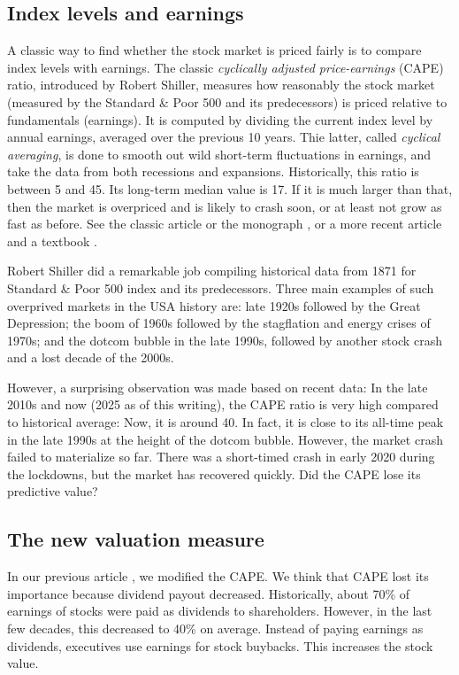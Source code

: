 \documentclass[12pt]{amsart}
\begin{document}
\subsection{Index levels and earnings} A classic way to find whether the stock market is priced fairly is to compare index levels with earnings. The classic {\it cyclically adjusted price-earnings} (CAPE) ratio, introduced by Robert Shiller, measures how reasonably the stock market (measured by the Standard \& Poor 500 and its predecessors) is priced relative to fundamentals (earnings). It is computed by dividing the current index level by annual earnings, averaged over the previous 10 years. Thie latter, called {\it cyclical averaging}, is done to smooth out wild short-term fluctuations in earnings, and take the data from both recessions and expansions. Historically, this ratio is between 5 and 45. Its long-term median value is 17. If it is much larger than that, then the market is overpriced and is likely to crash soon, or at least not grow as fast as before. See the classic article \cite{ShillerPaper} or the monograph \cite{ShillerBook}, or a more recent article \cite{Ural} and a textbook \cite[Chapter 8, Sections 4, 6]{Ilmanen}.

Robert Shiller did a remarkable job compiling historical data from 1871 for Standard \& Poor 500 index and its predecessors. Three main examples of such overprived markets in the USA history are: late 1920s followed by the Great Depression; the boom of 1960s followed by the stagflation and energy crises of 1970s; and the dotcom bubble in the late 1990s, followed by another stock crash and a lost decade of the 2000s. 

However, a surprising observation was made based on recent data: In the late 2010s and now (2025 as of this writing), the CAPE ratio is very high compared to historical average: Now, it is around 40. In fact, it is close to its all-time peak in the late 1990s at the height of the dotcom bubble. However, the market crash failed to materialize so far. There was a short-timed crash in early 2020 during the lockdowns, but the market has recovered quickly. Did the CAPE lose its predictive value? 

\subsection{The new valuation measure} In our previous article \cite{Valuation}, we modified the CAPE. We think that CAPE lost its importance because dividend payout decreased. Historically, about 70\% of earnings of stocks were paid as dividends to shareholders. However, in the last few decades, this decreased to 40\% on average. Instead of paying earnings as dividends, executives use earnings for stock buybacks. This increases the stock value. 
\end{document}
